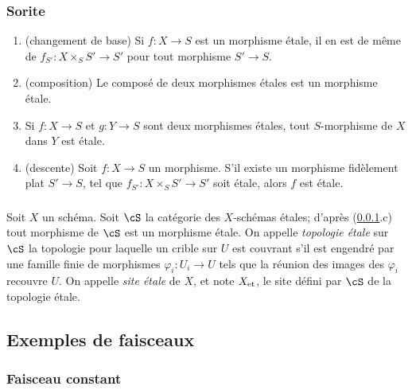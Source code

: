 \subsubsection{Sorite}\label{I:2-1-3}
\begin{enumerate}[\indent a)]
  \item (changement de base) Si $f:X\to S$ est un morphisme étale, il en est 
    de même de $f_{S'}:X\times_S S'\to S'$ pour tout morphisme $S'\to S$. 
  \item (composition) Le composé de deux morphismes étales est un morphisme étale.
  \item Si $f:X\to S$ et $g:Y\to S$ sont deux morphismes étales, tout 
    $S$-morphisme de $X$ dans $Y$ est étale.
  \item (descente) Soit $f:X\to S$ un morphisme. S'il existe un morphisme 
    fidèlement plat $S'\to S$, tel que $f_{S'}:X\times_S S'\to S'$ soit 
    étale, alors $f$ est étale.
\end{enumerate}





\subsubsection{}\label{I:2-1-4}

Soit $X$ un schéma. Soit $\cS$ la catégorie des $X$-schémas étales; 
d'après (\ref{I:2-1-3}.c) tout morphisme de $\cS$ est un morphisme étale. 
On appelle \emph{topologie étale} sur $\cS$ la topologie pour laquelle un 
crible sur $U$ est couvrant s'il est engendré par une famille finie de 
morphismes $\varphi_i:U_i\to U$ tels que la réunion des images des 
$\varphi_i$ recouvre $U$. On appelle \emph{site étale} de $X$, et note 
${X}_{\textnormal{et}}$, le site défini par $\cS$ de la topologie étale. 










\subsection{Exemples de faisceaux}\label{I:2-2}





\subsubsection{Faisceau constant}\label{I:2-2-1}


